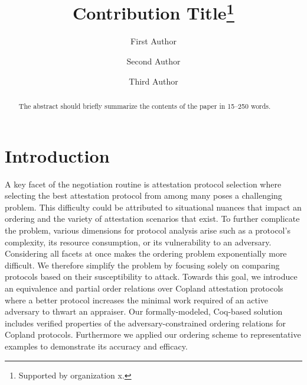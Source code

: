 \documentclass[runningheads]{llncs}
\theoremstyle{definition}
\begin{document}
%
\title{Contribution Title\thanks{Supported by organization x.}}
%
%
\author{First Author \and
Second Author \and
Third Author}
%
%
%
\maketitle              %
%
\begin{abstract}
The abstract should briefly summarize the contents of the paper in
15--250 words.

\end{abstract}
%
%
%
\section{Introduction}
A key facet of the negotiation routine is attestation protocol selection where selecting the best attestation protocol from among many poses a challenging problem. This difficulty could be attributed to situational nuances that impact an ordering and the variety of attestation scenarios that exist. To further complicate the problem, various dimensions for protocol analysis arise such as a protocol's complexity, its resource consumption, or its vulnerability to an adversary. Considering all facets at once makes the ordering problem exponentially more difficult. We therefore simplify the problem by focusing solely on comparing protocols based on their susceptibility to attack. Towards this goal, we introduce an equivalence and partial order relations over Copland attestation protocols where a better protocol increases the minimal work required of an active adversary to thwart an appraiser. Our formally-modeled, Coq-based solution includes verified properties of the adversary-constrained ordering relations for Copland protocols. Furthermore we applied our ordering scheme to representative examples to demonstrate its accuracy and efficacy.
\end{document}
